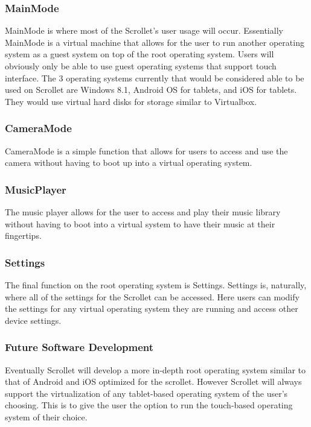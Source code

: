 \documentclass[a4paper]{article}
\begin{document}
\subsubsection{MainMode}
MainMode is where most of the Scrollet's user usage will occur. Essentially MainMode is a virtual machine that allows for the user to run another operating system as a guest system on top of the root operating system. Users will obviously only be able to use guest operating systems that support touch interface. The 3 operating systems currently that would be considered able to be used on Scrollet are Windows 8.1, Android OS for tablets, and iOS for tablets. They would use virtual hard disks for storage similar to Virtualbox.

\subsubsection{CameraMode}
CameraMode is a simple function that allows for users to access and use the camera without having to boot up into a virtual operating system.

\subsubsection{MusicPlayer}
The music player allows for the user to access and play their music library without having to boot into a virtual system to have their music at their fingertips.

\subsubsection{Settings}
The final function on the root operating system is Settings. Settings is, naturally, where all of the settings for the Scrollet can be accessed. Here users can modify the settings for any virtual operating system they are running and access other device settings.

\subsubsection{Future Software Development}
Eventually Scrollet will develop a more in-depth root operating system similar to that of Android and iOS optimized for the scrollet. However Scrollet will always support the virtualization of any tablet-based operating system of the user's choosing. This is to give the user the option to run the touch-based operating system of their choice.
\end{document}
